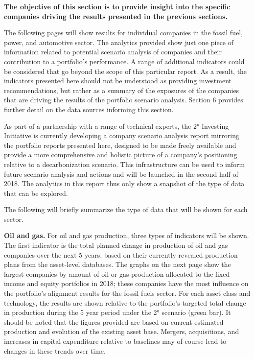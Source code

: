 \documentclass[10pt,table,a4]{article}\usepackage[]{graphicx}\usepackage[]{color}
\begin{document}
	\begin{multicols}{2}
		
		\textbf{The objective of this section is to provide insight into the specific companies driving the
			results presented in the previous sections.}
		
		The following pages will show results for individual companies in the fossil fuel, power, and automotive sector. The analytics provided show just one piece of information related to potential scenario analysis of companies and their contribution to a portfolio's performance. A range of additional indicators could be considered that go beyond the scope of this particular report. As a result, the indicators presented here should not be understood as providing investment recommendations, but rather as a summary of the exposures of the companies that are driving the results of the portfolio scenario analysis. Section 6 provides further detail on the data sources informing this section. 
		
		As part of a partnership with a range of technical experts, the 2° Investing Initiative is currently developing a company scenario analysis report mirroring the portfolio reports presented here, designed to be made freely available and provide a more comprehensive and holistic picture of a company's positioning relative to a decarbonization scenario. This infrastructure can be used to inform future scenario analysis and actions and will be launched in the second half of 2018. The analytics in this report thus only show a snapshot of the type of data that can be explored. 
		
		The following will briefly summarize the type of data that will be shown for each sector. 
		
		\textbf{Oil and gas.} For oil and gas production, three types of indicators will be shown. The first indicator is the total planned change in production of oil and gas companies over the next 5 years, based on their currently revealed production plans from the asset-level databases. The graphs on the next page show the largest companies by amount of oil or gas production allocated to the fixed income and equity portfolios in 2018; these companies have the most influence on the portfolio's alignment results for the fossil fuels sector. For each asset class and technology, the results are shown relative to the portfolio's targeted total change in production during the 5 year period under the 2° scenario (green bar). It should be noted that the figures provided are based on current estimated production and evolution of the existing asset base.  Mergers, acquisitions, and increases in capital expenditure relative to baselines may of course lead to changes in these trends over time. 
		

\end{multicols}
\end{document}
